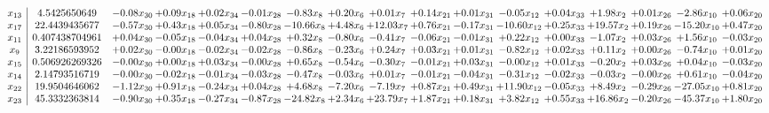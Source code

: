 \documentclass[9pt]{article}
\begin{document}
 \[\begin{array}{c| c c@{\hskip 2pt} c@{\hskip 2pt} c@{\hskip 2pt} c@{\hskip 2pt} c@{\hskip 2pt} c@{\hskip 2pt} c@{\hskip 2pt} c@{\hskip 2pt} c@{\hskip 2pt} c@{\hskip 2pt} c@{\hskip 2pt} c@{\hskip 2pt} c@{\hskip 2pt} c@{\hskip 2pt} c@{\hskip 2pt} }
 x_{13}   &  4.5425650649 & -0.08 x_{30} & +  0.09 x_{18} & +  0.02 x_{34} & -0.01 x_{28} & -0.83 x_{8} & +  0.20 x_{6} & +  0.01 x_{7} & +  0.14 x_{21} & +  0.01 x_{31} & -0.05 x_{12} & +  0.04 x_{33} & +  1.98 x_{2} & +  0.01 x_{26} & -2.86 x_{10} & +  0.06 x_{20}\\
 x_{17}   &  22.4439435677 & -0.57 x_{30} & +  0.43 x_{18} & +  0.05 x_{34} & -0.80 x_{28} & -10.66 x_{8} & +  4.48 x_{6} & + 12.03 x_{7} & +  0.76 x_{21} & -0.17 x_{31} & -10.60 x_{12} & +  0.25 x_{33} & + 19.57 x_{2} & +  0.19 x_{26} & -15.20 x_{10} & +  0.47 x_{20}\\
 x_{11}   &  0.407438704961 & +  0.04 x_{30} & -0.05 x_{18} & -0.04 x_{34} & +  0.04 x_{28} & +  0.32 x_{8} & -0.80 x_{6} & -0.41 x_{7} & -0.06 x_{21} & -0.01 x_{31} & +  0.22 x_{12} & +  0.00 x_{33} & -1.07 x_{2} & +  0.03 x_{26} & +  1.56 x_{10} & -0.03 x_{20}\\
 x_{9}   &  3.22186593952 & +  0.02 x_{30} & -0.00 x_{18} & -0.02 x_{34} & -0.02 x_{28} & -0.86 x_{8} & -0.23 x_{6} & +  0.24 x_{7} & +  0.03 x_{21} & +  0.01 x_{31} & -0.82 x_{12} & +  0.02 x_{33} & +  0.11 x_{2} & +  0.00 x_{26} & -0.74 x_{10} & +  0.01 x_{20}\\
 x_{15}   &  0.506926269326 & -0.00 x_{30} & +  0.00 x_{18} & +  0.03 x_{34} & -0.00 x_{28} & +  0.65 x_{8} & -0.54 x_{6} & -0.30 x_{7} & -0.01 x_{21} & +  0.03 x_{31} & -0.00 x_{12} & +  0.01 x_{33} & -0.20 x_{2} & +  0.03 x_{26} & +  0.04 x_{10} & -0.03 x_{20}\\
 x_{14}   &  2.14793516719 & -0.00 x_{30} & -0.02 x_{18} & -0.01 x_{34} & -0.03 x_{28} & -0.47 x_{8} & -0.03 x_{6} & +  0.01 x_{7} & -0.01 x_{21} & -0.04 x_{31} & -0.31 x_{12} & -0.02 x_{33} & -0.03 x_{2} & -0.00 x_{26} & +  0.61 x_{10} & -0.04 x_{20}\\
 x_{22}   &  19.9504646062 & -1.12 x_{30} & +  0.91 x_{18} & -0.24 x_{34} & +  0.04 x_{28} & +  4.68 x_{8} & -7.20 x_{6} & -7.19 x_{7} & +  0.87 x_{21} & +  0.49 x_{31} & + 11.90 x_{12} & -0.05 x_{33} & +  8.49 x_{2} & -0.29 x_{26} & -27.05 x_{10} & +  0.81 x_{20}\\
 x_{23}   &  45.3332363814 & -0.90 x_{30} & +  0.35 x_{18} & -0.27 x_{34} & -0.87 x_{28} & -24.82 x_{8} & +  2.34 x_{6} & + 23.79 x_{7} & +  1.87 x_{21} & +  0.18 x_{31} & +  3.82 x_{12} & +  0.55 x_{33} & + 16.86 x_{2} & -0.20 x_{26} & -45.37 x_{10} & +  1.80 x_{20}\\

\end{array}\]
\end{document}
